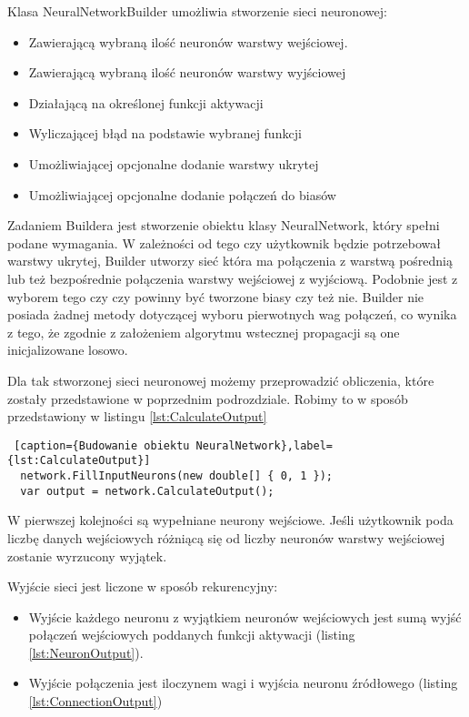 Klasa NeuralNetworkBuilder umożliwia stworzenie sieci neuronowej:
\begin{itemize}
  \item Zawierającą wybraną ilość neuronów warstwy wejściowej.
  \item Zawierającą wybraną ilość neuronów warstwy wyjściowej
  \item Działającą na określonej funkcji aktywacji
  \item Wyliczającej błąd na podstawie wybranej funkcji
  \item Umożliwiającej opcjonalne dodanie warstwy ukrytej
  \item Umożliwiającej opcjonalne dodanie połączeń do biasów
\end{itemize}

Zadaniem Buildera jest stworzenie obiektu klasy NeuralNetwork, który spełni podane wymagania. 
W zależności od tego czy użytkownik będzie potrzebował warstwy ukrytej, Builder utworzy sieć która ma połączenia z warstwą pośrednią lub też bezpośrednie połączenia warstwy wejściowej z wyjściową.
Podobnie jest z wyborem tego czy czy powinny być tworzone biasy czy też nie.
Builder nie posiada żadnej metody dotyczącej wyboru pierwotnych wag połączeń, co wynika z tego, że zgodnie z założeniem algorytmu wstecznej propagacji są one inicjalizowane losowo.

Dla tak stworzonej sieci neuronowej możemy przeprowadzić obliczenia, które zostały przedstawione w poprzednim podrozdziale.
Robimy to w sposób przedstawiony w listingu \ref{lst:CalculateOutput}

\begin{lstlisting} [caption={Budowanie obiektu NeuralNetwork},label={lst:CalculateOutput}]
  network.FillInputNeurons(new double[] { 0, 1 });
  var output = network.CalculateOutput();
\end{lstlisting}

W pierwszej kolejności są wypełniane neurony wejściowe.
Jeśli użytkownik poda liczbę danych wejściowych różniącą się od liczby neuronów warstwy wejściowej zostanie wyrzucony wyjątek.

Wyjście sieci jest liczone w sposób rekurencyjny:
\begin{itemize}
  \item Wyjście każdego neuronu z wyjątkiem neuronów wejściowych jest sumą wyjść połączeń wejściowych poddanych funkcji aktywacji (listing \ref{lst:NeuronOutput}).
  \item Wyjście połączenia jest iloczynem wagi i wyjścia neuronu źródłowego (listing \ref{lst:ConnectionOutput})
\end{itemize}

